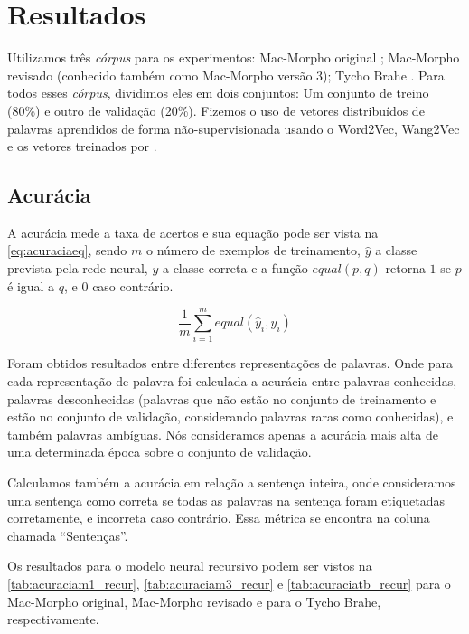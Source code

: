 \section{Resultados}

Utilizamos três \textit{córpus} para os experimentos: Mac-Morpho original \cite{aluisio2003account}; Mac-Morpho revisado \cite{fonseca2015evaluating} (conhecido também como Mac-Morpho versão 3); Tycho Brahe \cite{tychobrahe2010corpus}. Para todos esses \textit{córpus}, dividimos eles em dois conjuntos: Um conjunto de treino (80\%) e outro de validação (20\%). Fizemos o uso de vetores distribuídos de palavras aprendidos de forma não-supervisionada usando o Word2Vec, Wang2Vec e os vetores treinados por . 

\subsection{Acurácia}

A acurácia mede a taxa de acertos e sua equação pode ser vista na \autoref{eq:acuraciaeq}, sendo $m$ o número de exemplos de treinamento, $\hat{y}$ a classe prevista pela rede neural, $y$ a classe correta e a função $equal(p, q)$ retorna $1$ se $p$ é igual a $q$, e $0$ caso contrário.

\begin{equation}\label{eq:acuraciaeq}
\frac{1}{m} \sum\limits_{i=1}^{m} equal(\hat{y}_i, y_i) 
\end{equation}

Foram obtidos resultados entre diferentes representações de palavras. Onde para cada representação de palavra foi calculada a acurácia entre palavras conhecidas, palavras desconhecidas (palavras que não estão no conjunto de treinamento e estão no conjunto de validação, considerando palavras raras como conhecidas), e também palavras ambíguas. Nós consideramos apenas a acurácia mais alta de uma determinada época sobre o conjunto de validação. 

Calculamos também a acurácia em relação a sentença inteira, onde consideramos uma sentença como correta se todas as palavras na sentença foram etiquetadas corretamente, e incorreta caso contrário. Essa métrica se encontra na coluna chamada ``Sentenças''.


Os resultados para o modelo neural recursivo podem ser vistos na \autoref{tab:acuraciam1_recur}, \autoref{tab:acuraciam3_recur} e \autoref{tab:acuraciatb_recur} para o Mac-Morpho original, Mac-Morpho revisado e para o Tycho Brahe, respectivamente.

